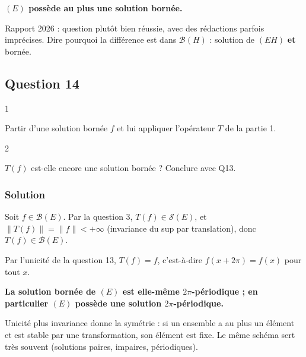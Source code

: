 \documentclass[11pt,a4paper]{article}
\begin{document}
\textbf{\((E)\) possède au plus une solution bornée.}

\begin{jury}

Rapport 2026 : question plutôt bien réussie, avec des rédactions parfois imprécises. Dire pourquoi la différence est dans \(\mathcal B(H)\) : solution de \((EH)\) \textbf{et} bornée.

\end{jury}

\hypertarget{question-14}{%
\subsection{Question 14}\label{question-14}}

\begin{indication}{1}

Partir d'une solution bornée \(f\) et lui appliquer l'opérateur \(T\) de la partie 1.

\end{indication}

\begin{indication}{2}

\(T(f)\) est-elle encore une solution bornée ? Conclure avec Q13.

\end{indication}

\hypertarget{solution-13}{%
\subsubsection{Solution}\label{solution-13}}

Soit \(f\in\mathcal B(E)\). Par la question 3, \(T(f)\in\mathcal S(E)\), et \(\|T(f)\|=\|f\|<+\infty\) (invariance du sup par translation), donc \(T(f)\in\mathcal B(E)\).

Par l'unicité de la question 13, \(T(f)=f\), c'est-à-dire \(f(x+2\pi)=f(x)\) pour tout \(x\).

\textbf{La solution bornée de \((E)\) est elle-même \(2\pi\)-périodique ; en particulier \((E)\) possède une solution \(2\pi\)-périodique.}

\begin{methode}

Unicité plus invariance donne la symétrie : si un ensemble a au plus un élément et est stable par une transformation, son élément est fixe. Le même schéma sert très souvent (solutions paires, impaires, périodiques).

\end{methode}
\end{document}
